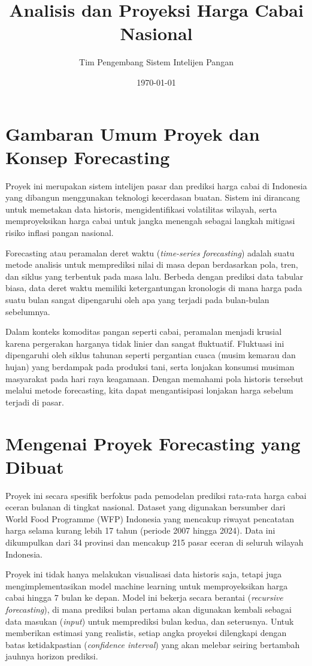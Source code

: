 \documentclass[12pt, a4paper]{article}
\title{\textbf{Analisis dan Proyeksi Harga Cabai Nasional}}
\author{Tim Pengembang Sistem Intelijen Pangan}
\date{\today}
\begin{document}
\maketitle

\section{Gambaran Umum Proyek dan Konsep Forecasting}

Proyek ini merupakan sistem intelijen pasar dan prediksi harga cabai di Indonesia yang dibangun menggunakan teknologi kecerdasan buatan. Sistem ini dirancang untuk memetakan data historis, mengidentifikasi volatilitas wilayah, serta memproyeksikan harga cabai untuk jangka menengah sebagai langkah mitigasi risiko inflasi pangan nasional.

Forecasting atau peramalan deret waktu (\textit{time-series forecasting}) adalah suatu metode analisis untuk memprediksi nilai di masa depan berdasarkan pola, tren, dan siklus yang terbentuk pada masa lalu. Berbeda dengan prediksi data tabular biasa, data deret waktu memiliki ketergantungan kronologis di mana harga pada suatu bulan sangat dipengaruhi oleh apa yang terjadi pada bulan-bulan sebelumnya.

Dalam konteks komoditas pangan seperti cabai, peramalan menjadi krusial karena pergerakan harganya tidak linier dan sangat fluktuatif. Fluktuasi ini dipengaruhi oleh siklus tahunan seperti pergantian cuaca (musim kemarau dan hujan) yang berdampak pada produksi tani, serta lonjakan konsumsi musiman masyarakat pada hari raya keagamaan. Dengan memahami pola historis tersebut melalui metode forecasting, kita dapat mengantisipasi lonjakan harga sebelum terjadi di pasar.

\section{Mengenai Proyek Forecasting yang Dibuat}

Proyek ini secara spesifik berfokus pada pemodelan prediksi rata-rata harga cabai eceran bulanan di tingkat nasional. Dataset yang digunakan bersumber dari World Food Programme (WFP) Indonesia yang mencakup riwayat pencatatan harga selama kurang lebih 17 tahun (periode 2007 hingga 2024). Data ini dikumpulkan dari 34 provinsi dan mencakup 215 pasar eceran di seluruh wilayah Indonesia.

Proyek ini tidak hanya melakukan visualisasi data historis saja, tetapi juga mengimplementasikan model machine learning untuk memproyeksikan harga cabai hingga 7 bulan ke depan. Model ini bekerja secara berantai (\textit{recursive forecasting}), di mana prediksi bulan pertama akan digunakan kembali sebagai data masukan (\textit{input}) untuk memprediksi bulan kedua, dan seterusnya. Untuk memberikan estimasi yang realistis, setiap angka proyeksi dilengkapi dengan batas ketidakpastian (\textit{confidence interval}) yang akan melebar seiring bertambah jauhnya horizon prediksi.
\end{document}
